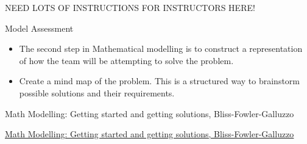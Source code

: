 \begin{annotation}
\begin{goals}
	NEED LOTS OF INSTRUCTIONS FOR INSTRUCTORS HERE!
\end{goals}	
\end{annotation}


















\standardonlynewpage


%
%



\begin{module}{Model Assessment}
	\label{analysis}

\begin{siam}
	
	
\end{siam}

\end{module}



\begin{lesson}

	\begin{itemize}
		\item The second step in Mathematical modelling is to construct a representation of how the team will be attempting to solve the problem.
		\item Create a mind map of the problem. This is a structured way to brainstorm possible solutions and their requirements.
	\end{itemize}
	

\begin{annotation}
	\begin{goals}
	Math Modelling: Getting started and getting solutions, Bliss-Fowler-Galluzzo
	
	\hfill {}	
	\end{goals}
\end{annotation}
	 \href{https://m3challenge.siam.org/resources/modeling-handbook}{Math Modelling: Getting started and getting solutions, Bliss-Fowler-Galluzzo}

\end{lesson}




